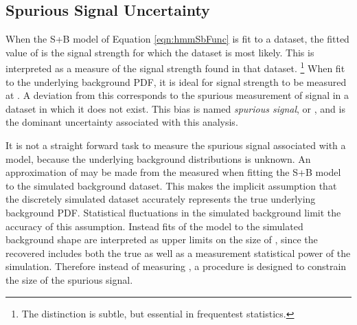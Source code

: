\subsection{Spurious Signal Uncertainty}

When the S+B model of Equation \ref{eqn:hmmSbFunc} is fit to a dataset, the fitted value of \mus is the signal strength for which the dataset is most likely.
This is interpreted as a measure of the signal strength found in that dataset. 
\footnote{The distinction is subtle, but essential in frequentest statistics.}
When fit to the underlying background PDF, it is ideal for signal strength to be measured at .
A deviation from this corresponds to the spurious measurement of signal in a dataset in which it does not exist.
This bias is named \emph{spurious signal}, or \nss, and is the dominant uncertainty associated with this analysis.

It is not a straight forward task to measure the spurious signal associated with a model, because the underlying background distributions is unknown. 
An approximation of \nss may be made from the \mus measured when fitting the S+B model to the simulated background dataset.
This makes the implicit assumption that the discretely simulated dataset accurately represents the true underlying background PDF.
Statistical fluctuations in the simulated background limit the accuracy of this assumption.
Instead fits of the model to the simulated background shape are interpreted as upper limits on the size of \nss, since the recovered \mus includes both the true \nss as well as a measurement statistical power of the simulation.
Therefore instead of measuring \nss, a procedure is designed to constrain the size of the spurious signal. 

